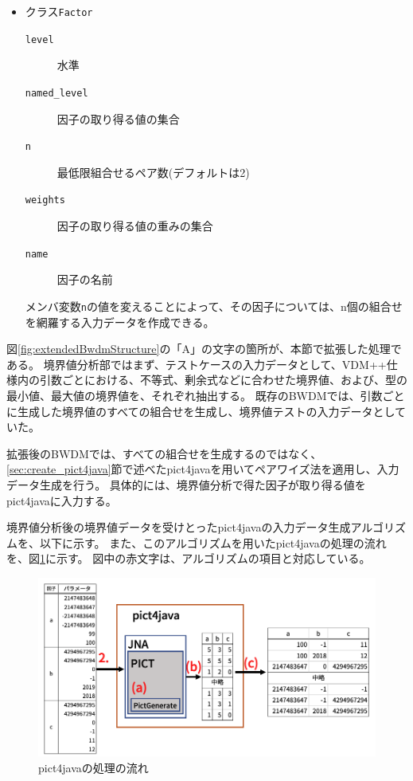 \documentclass[uplatex, report, a4j, 10pt]{jsbook}
\newcommand\ttt[1]{\texttt{#1}}
\begin{document}
\begin{itemize}
\begin{description}
        \end{description}
  \item クラス\ttt{Factor}
        \begin{description}
          \item[\ttt{level}] 水準
          \item[\ttt{named\_level}] 因子の取り得る値の集合
          \item[\ttt{n}] 最低限組合せるペア数(デフォルトは2)
          \item[\ttt{weights}] 因子の取り得る値の重みの集合
          \item[\ttt{name}] 因子の名前
        \end{description}
        メンバ変数\ttt{n}の値を変えることによって、その因子については、n個の組合せを網羅する入力データを作成できる。
\end{itemize}

図\ref{fig:extendedBwdmStructure}の「A」の文字の箇所が、本節で拡張した処理である。
境界値分析部ではまず、テストケースの入力データとして、VDM++仕様内の引数ごとにおける、不等式、剰余式などに合わせた境界値、および、型の最小値、最大値の境界値を、それぞれ抽出する。
既存のBWDMでは、引数ごとに生成した境界値のすべての組合せを生成し、境界値テストの入力データとしていた。

拡張後のBWDMでは、すべての組合せを生成するのではなく、\ref{sec:create_pict4java}節で述べたpict4javaを用いてペアワイズ法を適用し、入力データ生成を行う。
具体的には、境界値分析で得た因子が取り得る値をpict4javaに入力する。

境界値分析後の境界値データを受けとったpict4javaの入力データ生成アルゴリズムを、以下に示す。
また、このアルゴリズムを用いたpict4javaの処理の流れを、図\ref{fig:pict4java}に示す。
図中の赤文字は、アルゴリズムの項目と対応している。

\begin{figure}[tp]
  \centering
  \includegraphics[keepaspectratio, width=160mm]{figs/pict4java}
  \caption{pict4javaの処理の流れ}
  \label{fig:pict4java}
\end{figure}
\end{document}
